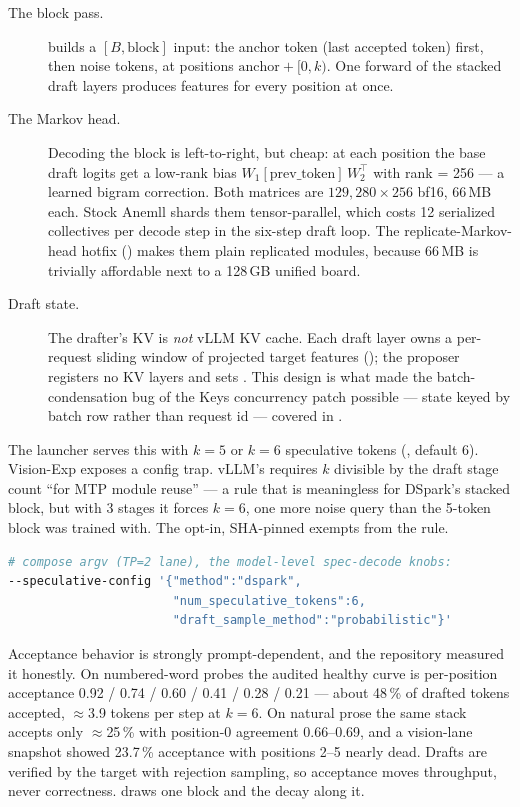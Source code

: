 \begin{description}
  \item[The block pass.]  builds a $[B, \mathrm{block}]$ input:
  the anchor token (last accepted token) first, then noise tokens, at
  positions $\mathrm{anchor} + [0, k)$. One forward of the stacked draft
  layers produces features for every position at once.
  \item[The Markov head.] Decoding the block is left-to-right, but cheap: at
  each position the base draft logits get a low-rank bias
  $W_1[\mathrm{prev\_token}] \, W_2^{\top}$ with rank
   = 256 --- a learned bigram correction. Both
  matrices are $129{,}280 \times 256$ bf16, 66\,MB each. Stock Anemll shards
  them tensor-parallel, which costs 12 serialized collectives per decode step
  in the six-step draft loop. The replicate-Markov-head hotfix
  () makes them plain replicated modules, because 66\,MB is
  trivially affordable next to a 128\,GB unified board.
  \item[Draft state.] The drafter's KV is \emph{not} vLLM KV cache. Each draft
  layer owns a per-request sliding window of projected target features
  (); the proposer registers no KV layers and sets
  . This design is what made the batch-condensation bug
  of the Keys concurrency patch possible --- state keyed by batch row rather
  than request id --- covered in .
\end{description}

The launcher serves this with $k=5$ or $k=6$ speculative tokens
(, default 6). Vision-Exp exposes a config trap.
vLLM's  requires $k$ divisible by the draft stage
count ``for MTP module reuse'' --- a rule that is meaningless for DSpark's
stacked block, but with 3 stages it forces $k = 6$, one more noise query
than the 5-token block was trained with. The opt-in, SHA-pinned
 exempts
 from the rule.

\begin{lstlisting}[language=bash]
# compose argv (TP=2 lane), the model-level spec-decode knobs:
--speculative-config '{"method":"dspark",
                       "num_speculative_tokens":6,
                       "draft_sample_method":"probabilistic"}'
\end{lstlisting}

Acceptance behavior is strongly prompt-dependent, and the repository measured it
honestly. On numbered-word probes the audited healthy curve is per-position
acceptance 0.92 / 0.74 / 0.60 / 0.41 / 0.28 / 0.21 --- about 48\,\% of drafted
tokens accepted, $\approx$3.9 tokens per step at $k=6$. On natural prose the
same stack accepts only $\approx$25\,\% with position-0 agreement
0.66--0.69, and a vision-lane  snapshot showed 23.7\,\%
acceptance with positions 2--5 nearly dead. Drafts are verified by the target
with rejection sampling, so acceptance moves throughput, never correctness.
 draws one block and the decay along it.


